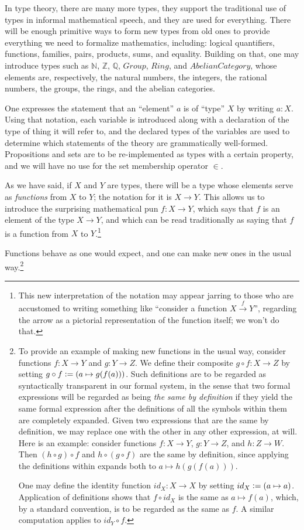\documentclass[letter,12pt]{amsart}
\theoremstyle{definition}
\theoremstyle{remark}
\numberwithin{equation}{section}
\newcommand{\QQ}{\mathbb{Q}}
\newcommand{\ZZ}{\mathbb{Z}}
\newcommand{\NN}{\mathbb{N}}
\newcommand{\defeq}{\vcentcolon=}
\begin{document}
In type theory, there are many more types, they support the traditional use of types in informal mathematical speech, and they are used for
everything.  There will be enough primitive ways to form new types from old ones to provide everything we need to formalize mathematics,
including: logical quantifiers, functions, families, pairs, products, sums, and equality.  Building on that, one may introduce types such as
$\NN$, $\ZZ$, $\QQ$, $Group$, $Ring$, and $AbelianCategory$, whose elements are, respectively, the natural numbers, the integers, the rational
numbers, the groups, the rings, and the abelian categories.

One expresses the statement that an ``element'' $a$ is of ``type'' $X$ by writing $a:X$.  Using that notation, each variable is introduced along
with a declaration of the type of thing it will refer to, and the declared types of the variables are used to determine which statements of the
theory are grammatically well-formed.  Propositions and sets are to be re-implemented as types with a certain property, and we will have no use
for the set membership operator $\in$.

As we have said, if $X$ and $Y$ are types, there will be a type whose elements serve as {\em functions} from $X$ to $Y$; the notation for it is
$X \to Y$.  This allows us to introduce the surprising mathematical pun $f : X \to Y$, which says that $f$ is an element of the type $X \to Y$,
and which can be read traditionally as saying that $f$ is a function from $X$ to $Y$.\footnote{This new interpretation of the notation may
  appear jarring to those who are accustomed to writing something like ``consider a function $X \xrightarrow f Y$'', regarding the arrow as a
  pictorial representation of the function itself; we won't do that.}

Functions behave as one would expect, and one can make new ones in the usual way.\footnote{ To provide an example of making new functions in the
  usual way, consider functions $f : X \to Y$ and $g : Y \to Z$.  We define their composite $g \circ f : X \to Z$ by setting $g \circ f \defeq
  (a \mapsto g(f(a)))$.  Such definitions are to be regarded as syntactically transparent in our formal system, in the sense that two formal
  expressions will be regarded as being {\em the same by definition} if they yield the same formal expression after the definitions of all the
  symbols within them are completely expanded.  Given two expressions that are the same by definition, we may replace one with the other in any
  other expression, at will.  Here is an example: consider functions $f : X \to Y$, $g : Y \to Z$, and $h : Z \to W$.  Then $(h \circ g) \circ
  f$ and $h \circ (g \circ f)$ are the same by definition, since applying the definitions within expands both to $a \mapsto h(g(f(a)))$.

  One may define the identity function $id_X : X \to X$ by setting $id_X \defeq (a \mapsto a)$.  Application of definitions shows that $f \circ
  id_X$ is the same as $a \mapsto f(a)$, which, by a standard convention, is to be regarded as the same as $f$.  A similar computation applies
  to $id_Y \circ f$.
}
\end{document}
